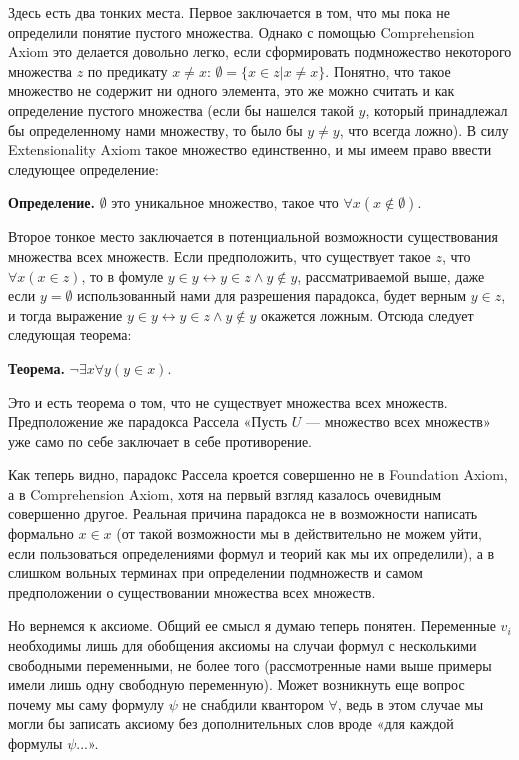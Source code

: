 Здесь есть два тонких места. Первое заключается в том, что мы пока не определили понятие пустого множества. Однако с помощью Comprehension Axiom это делается довольно легко, если сформировать подмножество некоторого множества $z$ по предикату $x \not= x$: $\emptyset = \{x \in z |x \not= x\}$. Понятно, что такое множество не содержит ни одного элемента, это же можно считать и как определение пустого множества (если бы нашелся такой $y$, который принадлежал бы определенному нами множеству, то было бы $y\not= y$, что всегда ложно). В силу Extensionality Axiom такое множество единственно, и мы имеем право ввести следующее определение:

{\bfseries Определение.} $\emptyset$ это уникальное множество, такое что $\forall x (x\not\in \emptyset)$.

Второе тонкое место заключается в потенциальной возможности существования множества всех множеств. Если предположить, что существует такое $z$, что $\forall x (x \in z)$, то в фомуле $y \in y \leftrightarrow y\in z \wedge y \not \in y$, рассматриваемой выше, даже если $y = \emptyset$ использованный нами для разрешения парадокса, будет верным $y \in z$, и тогда выражение $y \in y \leftrightarrow y\in z \wedge y \not \in y$ окажется ложным. Отсюда следует следующая теорема:

{\bfseries Теорема.} $\neg \exists x \forall y (y \in x)$.

Это и есть теорема о том, что не существует множества всех множеств. Предположение же парадокса Рассела «Пусть $U$ — множество всех множеств» уже само по себе заключает в себе противорение.

Как теперь видно, парадокс Рассела кроется совершенно не в Foundation Axiom, а в Comprehension Axiom, хотя на первый взгляд казалось очевидным совершенно другое. Реальная причина парадокса не в возможности написать формально $x\in x$ (от такой возможности мы в действительно не можем уйти, если пользоваться определениями формул и теорий как мы их определили), а в слишком вольных терминах при определении подмножеств и самом предположении о существовании множества всех множеств.

Но вернемся к аксиоме. Общий ее смысл я думаю теперь понятен. Переменные $v_i$ необходимы лишь для обобщения аксиомы на случаи формул с несколькими свободными переменными, не более того (рассмотренные нами выше примеры имели лишь одну свободную переменную). Может возникнуть еще вопрос почему мы саму формулу $\psi$ не снабдили квантором $\forall$, ведь в этом случае мы могли бы записать аксиому без дополнительных слов вроде «для каждой формулы $\psi$...».

